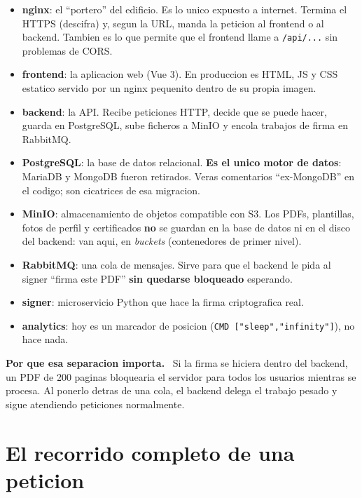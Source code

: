 \documentclass[11pt,a4paper,oneside]{report}
\newenvironment{concepto}[1][Concepto para juniors]{%
  \par\medskip
  \colorlet{shadecolor}{blue!7}%
  \begin{shaded}\noindent\textbf{\color{blue!55!black}#1.}\ \ignorespaces}%
  {\end{shaded}\par\medskip}
\newcommand{\rt}[1]{\texttt{#1}}
\begin{document}
\begin{itemize}[leftmargin=1.4em]
  \item \textbf{nginx}: el ``portero'' del edificio. Es lo unico expuesto a internet.
        Termina el HTTPS (descifra) y, segun la URL, manda la peticion al frontend o al
        backend. Tambien es lo que permite que el frontend llame a \rt{/api/...} sin
        problemas de CORS.
  \item \textbf{frontend}: la aplicacion web (Vue 3). En produccion es HTML, JS y CSS
        estatico servido por un nginx pequenito dentro de su propia imagen.
  \item \textbf{backend}: la API. Recibe peticiones HTTP, decide que se puede hacer, guarda
        en PostgreSQL, sube ficheros a MinIO y encola trabajos de firma en RabbitMQ.
  \item \textbf{PostgreSQL}: la base de datos relacional. \textbf{Es el unico motor de
        datos}: MariaDB y MongoDB fueron retirados. Veras comentarios ``ex-MongoDB'' en el
        codigo; son cicatrices de esa migracion.
  \item \textbf{MinIO}: almacenamiento de objetos compatible con S3. Los PDFs, plantillas,
        fotos de perfil y certificados \textbf{no} se guardan en la base de datos ni en el
        disco del backend: van aqui, en \emph{buckets} (contenedores de primer nivel).
  \item \textbf{RabbitMQ}: una cola de mensajes. Sirve para que el backend le pida al signer
        ``firma este PDF'' \textbf{sin quedarse bloqueado} esperando.
  \item \textbf{signer}: microservicio Python que hace la firma criptografica real.
  \item \textbf{analytics}: hoy es un marcador de posicion (\rt{CMD ["sleep","infinity"]}),
        no hace nada.
\end{itemize}

\begin{concepto}[Por que esa separacion importa]
Si la firma se hiciera dentro del backend, un PDF de 200 paginas bloquearia el servidor para
todos los usuarios mientras se procesa. Al ponerlo detras de una cola, el backend delega el
trabajo pesado y sigue atendiendo peticiones normalmente.
\end{concepto}

\chapter{El recorrido completo de una peticion}
\end{document}
